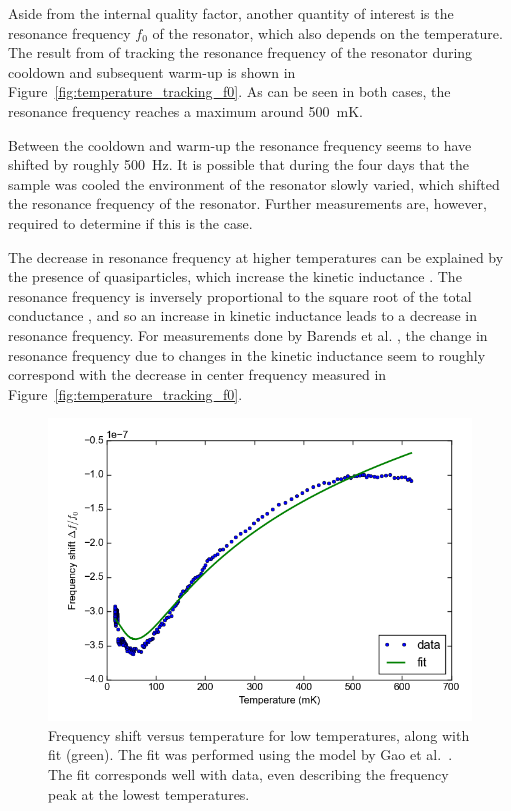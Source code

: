 Aside from the internal quality factor, another quantity of interest is the resonance frequency $f_0$ of the resonator, which also depends on the temperature. The result from of tracking the resonance frequency of the resonator during cooldown and subsequent warm-up is shown in Figure~\ref{fig:temperature_tracking_f0}. As can be seen in both cases, the resonance frequency reaches a maximum around \SI{500}{\milli \kelvin}.

Between the cooldown and warm-up the resonance frequency seems to have shifted by roughly \SI{500}{Hz}. It is possible that during the four days that the sample was cooled the environment of the resonator slowly varied, which shifted the resonance frequency of the resonator. Further measurements are, however, required to determine if this is the case.

The decrease in resonance frequency at higher temperatures can be explained by the presence of quasiparticles, which increase the kinetic inductance \cite[p91]{Geerlings}. The resonance frequency is inversely proportional to the square root of the total conductance \cite{barends2008contribution}, and so an increase in kinetic inductance leads to a decrease in resonance frequency. For measurements done by Barends et al. \cite{barends2008contribution}, the change in resonance frequency due to changes in the kinetic inductance seem to roughly correspond with the decrease in center frequency measured in Figure~\ref{fig:temperature_tracking_f0}.

\begin{figure}[h]
    \centering
    \includegraphics[width=.7\textwidth]{Figures/DRIE/Temperature increase tracking - f0 vs T with fit.png}
    \caption{Frequency shift versus temperature for low temperatures, along with fit (green). The fit was performed using the model by Gao et al.~\cite{gao2008experimental}. The fit corresponds well with data, even describing the frequency peak at the lowest temperatures.}
    \label{fig:f0_vs_T_with_fit}
\end{figure}

